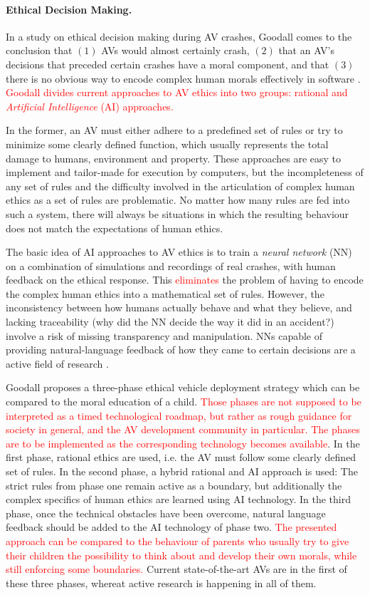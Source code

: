 \documentclass[11pt]{article}
\newcommand{\changed}[1]{\textcolor{red}{#1}}
\begin{document}
\paragraph{Ethical Decision Making.}
\label{sec:ethics}
In a study on ethical decision making during AV crashes, Goodall comes to the conclusion that $(1)$ AVs would almost certainly crash, $(2)$ that an AV's decisions that preceded certain crashes have a moral component, and that $(3)$ there is no obvious way to encode complex human morals effectively in software \cite{Goodall2014ethical}. \changed{Goodall divides current approaches to AV ethics into two groups: rational and \textit{Artificial Intelligence} (AI) approaches.}

In the former, an AV must either adhere to a predefined set of rules or try to minimize some clearly defined function, which usually represents the total damage to humans, environment and property. These approaches are easy to implement and tailor-made for execution by computers, but the incompleteness of any set of rules and the difficulty involved in the articulation of complex human ethics as a set of rules are problematic. No matter how many rules are fed into such a system, there will always be situations in which the resulting behaviour does not match the expectations of human ethics.

The basic idea of AI approaches to AV ethics is to train a \textit{neural network} (NN) on a combination of simulations and recordings of real crashes, with human feedback on the ethical response. This \changed{eliminates} the problem of having to encode the complex human ethics into a mathematical set of rules. However, the inconsistency between how humans actually behave and what they believe, and lacking traceability (why did the NN decide the way it did in an accident?) involve a risk of missing transparency and manipulation. NNs capable of providing natural-language feedback of how they came to certain decisions are a active field of research \cite[p. 63]{Goodall2014ethical}.

Goodall proposes a three-phase ethical vehicle deployment strategy \cite[p.63]{Goodall2014ethical} which can be compared to the moral education of a child. \changed{Those phases are not supposed to be interpreted as a timed technological roadmap, but rather as rough guidance for society in general, and the AV development community in particular. The phases are to be implemented as the corresponding technology becomes available}. In the first phase, rational ethics are used, i.e. the AV must follow some clearly defined set of rules. In the second phase, a hybrid rational and AI approach is used: The strict rules from phase one remain active as a boundary, but additionally the complex specifics of human ethics are learned using AI technology. In the third phase, once the technical obstacles have been overcome, natural language feedback should be added to the AI technology of phase two. \changed{The presented approach can be compared to the behaviour of parents who usually try to give their children the possibility to think about and develop their own morals, while still enforcing some boundaries.} Current state-of-the-art AVs are in the first of these three phases, whereat active research is happening in all of them.
\end{document}

